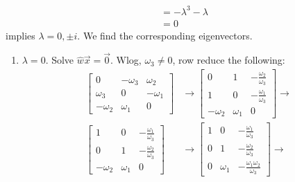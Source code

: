 \documentclass[12pt]{article}
\begin{document}
\begin{enumerate}
\begin{enumerate}
\begin{align}
                                                    &= - \lambda^3 - \lambda \\
                                                    &= 0
                    \end{align}
                    implies $\lambda=0, \pm i$. We find the corresponding eigenvectors.\\
                    \begin{enumerate}
                        \item $\lambda = 0$. Solve $\widehat{w} \vec{x} = \vec{0}$. Wlog, $\omega_3 \neq 0$, row reduce the following:
                            \begin{align*}
                                \begin{bmatrix}
                                    0 & -\omega_3  & \omega_2\\ 
                                    \omega_3 & 0  & -\omega_1\\ 
                                    -\omega_2 & \omega_1 & 0
                                \end{bmatrix} &\rightarrow
                                \begin{bmatrix}
                                    0 & 1  & -\frac{\omega_2}{\omega_3}\\ 
                                    1 & 0  & -\frac{\omega_1}{\omega_3}\\ 
                                    -\omega_2 & \omega_1 & 0
                                \end{bmatrix} \rightarrow\\
                                \begin{bmatrix}
                                    1 & 0  & -\frac{\omega_1}{\omega_3}\\ 
                                    0 & 1  & -\frac{\omega_2}{\omega_3}\\
                                    -\omega_2 & \omega_1 & 0
                                \end{bmatrix} &\rightarrow
                                \begin{bmatrix}
                                    1 & 0  & -\frac{\omega_1}{\omega_3}\\ 
                                    0 & 1  & -\frac{\omega_2}{\omega_3}\\
                                    0 & \omega_1 & -\frac{\omega_1 \omega_2}{\omega_3}
                                \end{bmatrix} \rightarrow\\

\end{align*}
\end{enumerate}
\end{enumerate}
\end{enumerate}
\end{document}
